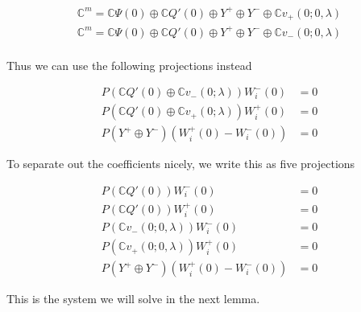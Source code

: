 \documentclass[12pt]{article}
\def\C{{\mathbb C}}
\begin{document}
\begin{align*}\label{directsum2}
\C^m = \C\Psi(0) \oplus \C Q'(0) \oplus Y^+ \oplus Y^- \oplus \C v_+(0; 0, \lambda) \\
\C^m = \C\Psi(0) \oplus \C Q'(0) \oplus Y^+ \oplus Y^- \oplus \C v_-(0; 0, \lambda) \\
\end{align*}

Thus we can use the following projections instead

\begin{align*}
P(\C Q'(0) \oplus \C v_-(0; \lambda) )W_i^-(0) &= 0 \\
P(\C Q'(0) \oplus \C v_+(0; \lambda) )W_i^+(0) &= 0 \\
P(Y^+ \oplus Y^-) (W_i^+(0) - W_i^-(0) ) &= 0
\end{align*}

To separate out the coefficients nicely, we write this as five projections

\begin{align*}
P(\C Q'(0) )W_i^-(0) &= 0 \\
P(\C Q'(0) )W_i^+(0) &= 0 \\
P(\C v_-(0; 0, \lambda))W_i^-(0) &= 0 \\
P(\C v_+(0; 0, \lambda))W_i^+(0) &= 0 \\
P(Y^+ \oplus Y^-) (W_i^+(0) - W_i^-(0) ) &= 0
\end{align*}

This is the system we will solve in the next lemma.

\end{document}
